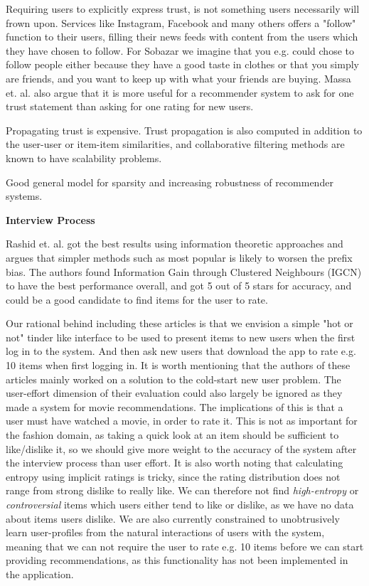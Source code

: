 Requiring users to explicitly express trust, is not something users necessarily will frown upon. Services like Instagram, Facebook and many others offers a "follow" function to their users, filling their news feeds with content from the users which they have chosen to follow. For Sobazar we imagine that you e.g. could chose to follow people either because they have a good taste in clothes or that you simply are friends, and you want to keep up with what your friends are buying. Massa et. al. \cite{Massa2004} also argue that it is more useful for a recommender system to ask for one trust statement than asking for one rating for new users.

Propagating trust is expensive. Trust propagation is also computed in addition to the user-user or item-item similarities, and collaborative filtering methods are known to have scalability problems.

Good general model for sparsity and increasing robustness of recommender systems.

\textbf{Interview Process}

Rashid et. al. \cite{Rashid2007} got the best results using information theoretic approaches and argues that simpler methods such as most popular is likely to worsen the prefix bias.
The authors found Information Gain through Clustered Neighbours (IGCN) to have the best performance overall, and got 5 out of 5 stars for accuracy, and could be a good candidate to find items for the user to rate.

Our rational behind including these articles is that we envision a simple "hot or not" tinder like interface to be used to present items to new users when the first log in to the system. And then ask new users that download the app to rate e.g. 10 items when first logging in. It is worth mentioning that the authors of these articles mainly worked on a solution to the cold-start new user problem. The user-effort dimension of their evaluation could also largely be ignored as they made a system for movie recommendations. The implications of this is that a user must have watched a movie, in order to rate it. This is not as important for the fashion domain, as taking a quick look at an item should be sufficient to like/dislike it, so we should give more weight to the accuracy of the system after the interview process than user effort. It is also worth noting that calculating entropy using implicit ratings is tricky, since the rating distribution does not range from strong dislike to really like. We can therefore not find \emph{high-entropy} or \emph{controversial} items which users either tend to like or dislike, as we have no data about items users dislike. We are also currently constrained to unobtrusively learn user-profiles from the natural interactions of users with the system, meaning that we can not require the user to rate e.g. 10 items before we can start providing recommendations, as this functionality has not been implemented in the application.

